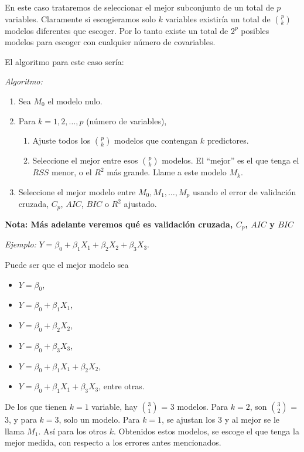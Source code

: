 \documentclass[
  12pt,
]{book}
\providecommand{\tightlist}{%
  \setlength{\itemsep}{0pt}\setlength{\parskip}{0pt}}
\begin{document}
En este caso trataremos de seleccionar el mejor subconjunto de un total
de \(p\) variables. Claramente si escogieramos solo \(k\) variables
existiría un total de \(\binom{p}{k}\) modelos diferentes que escoger.
Por lo tanto existe un total de \(2^p\) posibles modelos para escoger
con cualquier número de covariables.

El algoritmo para este caso sería:

\emph{Algoritmo:}

\begin{enumerate}
\def\labelenumi{\arabic{enumi}.}
\item
  Sea \(M_0\) el modelo nulo.
\item
  Para \(k=1,2,\dots,p\) (número de variables),

  \begin{enumerate}
  \def\labelenumii{\alph{enumii}.}
  \tightlist
  \item
    Ajuste todos los \(\binom{p}{k}\) modelos que contengan \(k\)
    predictores.
  \item
    Seleccione el mejor entre esos \(\binom{p}{k}\) modelos. El
    ``mejor'' es el que tenga el \(RSS\) menor, o el \(R^2\) más grande.
    Llame a este modelo \(M_k\).
  \end{enumerate}
\item
  Seleccione el mejor modelo entre \(M_0,M_1,\dots,M_p\) usando el error
  de validación cruzada, \(C_p\), \(AIC\), \(BIC\) o \(R^2\) ajustado.
\end{enumerate}

\textbf{Nota: Más adelante veremos qué es validación cruzada, \(C_p\),
\(AIC\) y \(BIC\)}

\emph{Ejemplo:} \(Y = \beta_0+\beta_1X_1+ \beta_2X_2 + \beta_3X_3\).

Puede ser que el mejor modelo sea

\begin{itemize}
\item
  \(Y = \beta_0\),
\item
  \(Y = \beta_0+\beta_1X_1\),
\item
  \(Y = \beta_0+\beta_2X_2\),
\item
  \(Y = \beta_0+\beta_3X_3\),
\item
  \(Y = \beta_0+\beta_1X_1+\beta_2X_2\),
\item
  \(Y = \beta_0+\beta_1X_1+\beta_3X_3\), entre otras.
\end{itemize}

De los que tienen \(k=1\) variable, hay \(\binom{3}{1}\) = 3 modelos.
Para \(k=2\), son \(\binom{3}{2}\) = 3, y para \(k=3\), solo un modelo.
Para \(k=1\), se ajustan los 3 y al mejor se le llama \(M_1\). Así para
los otros \(k\). Obtenidos estos modelos, se escoge el que tenga la
mejor medida, con respecto a los errores antes mencionados.
\end{document}

